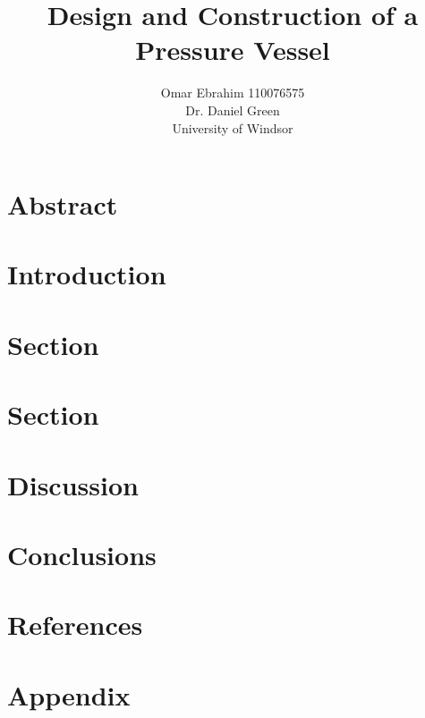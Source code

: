 \documentclass[12pt, titlepage]{article}
\title{Design and Construction of a Pressure Vessel}
\author{Omar Ebrahim 110076575\\Dr. Daniel Green\\ University of Windsor}
\begin{document}
\maketitle
\section*{Abstract}
\newpage
\tableofcontents
\listoffigures
\listoftables
\thispagestyle{tocstyle}
\newpage
\section{Introduction}
\newpage
\section{Section}
\newpage
\section{Section}
\newpage
\section{Discussion}
\newpage
\section{Conclusions}
\newpage
\section{References}
\newpage
\appendix
\section{Appendix}
\end{document}
